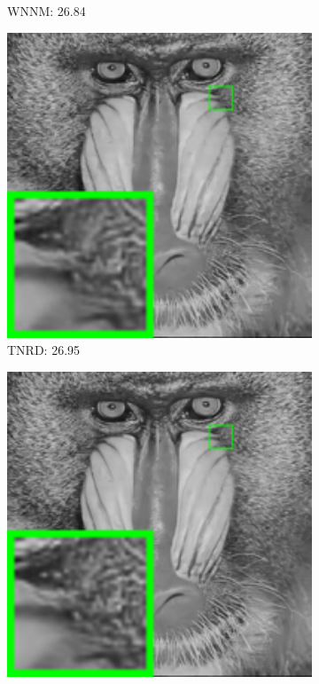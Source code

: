 \begin{figure}
\begin{adjustwidth}{-2cm}{}
\begin{subfigure}[t]{0.19\textwidth}
		\caption{WNNM: 26.84}
    \end{subfigure}
    \hfill
    \begin{subfigure}[t]{0.19\textwidth}
        \centering
        \includegraphics[width=1\textwidth]{images/twsc/awgn/resize_br_TNRD_20_baboon.png}
		\caption{TNRD: 26.95}
    \end{subfigure}
    \hfill
    \begin{subfigure}[t]{0.19\textwidth}
        \centering
        \includegraphics[width=1\textwidth]{images/twsc/awgn/resize_br_DnCNN_20_baboon.png}

\end{subfigure}
\end{adjustwidth}
\end{figure}
